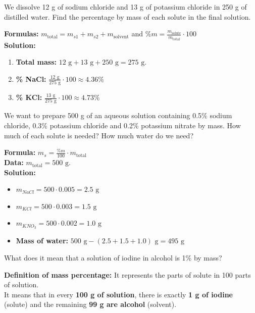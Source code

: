 \begin{exercise}
    We dissolve 12 g of sodium chloride and 13 g of potassium chloride in 250 g of distilled water. Find the percentage by mass of each solute in the final solution.
    \begin{solu}
        \textbf{Formulas:} $m_{\text{total}} = m_{s1} + m_{s2} + m_{\text{solvent}}$ and $\%m = \frac{m_{\text{solute}}}{m_{\text{total}}} \cdot 100$ \\
        \textbf{Solution:}
        \begin{enumerate}
            \item \textbf{Total mass:} $12 \text{ g} + 13 \text{ g} + 250 \text{ g} = 275 \text{ g}$.
            \item \textbf{\% NaCl:} $\frac{12 \text{ g}}{275 \text{ g}} \cdot 100 \approx 4.36\%$
            \item \textbf{\% KCl:} $\frac{13 \text{ g}}{275 \text{ g}} \cdot 100 \approx 4.73\%$
        \end{enumerate}
    \end{solu}
\end{exercise}

\begin{exercise}
    We want to prepare 500 g of an aqueous solution containing 0.5\% sodium chloride, 0.3\% potassium chloride and 0.2\% potassium nitrate by mass. How much of each solute is needed? How much water do we need?
    \begin{solu}
        \textbf{Formula:} $m_s = \frac{\%m}{100} \cdot m_{\text{total}}$ \\

        \textbf{Data:} $m_{\text{total}} = 500 \text{ g}$. \\

        \textbf{Solution:}
        \begin{itemize}
            \item $m_{NaCl} = 500 \cdot 0.005 = 2.5 \text{ g}$
            \item $m_{KCl} = 500 \cdot 0.003 = 1.5 \text{ g}$
            \item $m_{KNO_3} = 500 \cdot 0.002 = 1.0 \text{ g}$
            \item \textbf{Mass of water:} $500 \text{ g} - (2.5 + 1.5 + 1.0) \text{ g} = 495 \text{ g}$
        \end{itemize}
    \end{solu}
\end{exercise}

\begin{exercise}
    What does it mean that a solution of iodine in alcohol is 1\% by mass?
    \begin{solu}
        \textbf{Definition of mass percentage:} It represents the parts of solute in 100 parts of solution. \\
        It means that in every \textbf{100 g of solution}, there is exactly \textbf{1 g of iodine} (solute) and the remaining \textbf{99 g are alcohol} (solvent).
    \end{solu}
\end{exercise}

